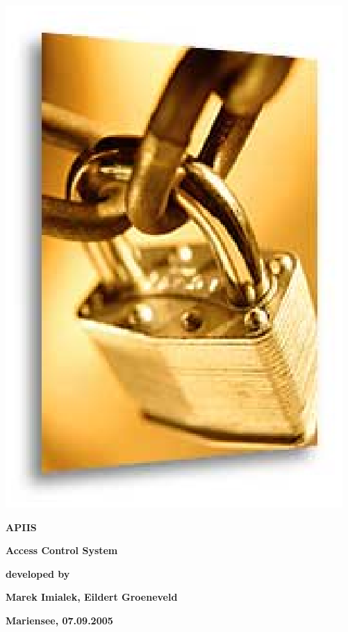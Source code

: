\documentclass[10pt,a4paper]{report}
\begin{document}
\thispagestyle{empty} 
\begin{center}
\includegraphics[scale=.7,]{padlock.ps}

\vspace{2cm}
\begin{Huge}\textbf{APIIS}\end{Huge}
\vspace{0.3cm}

\vspace{0.3cm}
\begin{Huge}\textbf{ Access Control System}\end{Huge}
\vspace{1cm}

\begin{Large}
\textbf{ developed by}
\vspace{0.2cm}

\textbf{Marek Imialek, 
        Eildert Groeneveld\\}
\end{Large}
\vspace{10cm}
\begin{large}\textbf{Mariensee, 07.09.2005}\end{large}
\end{center}

\tableofcontents

\end{document}
